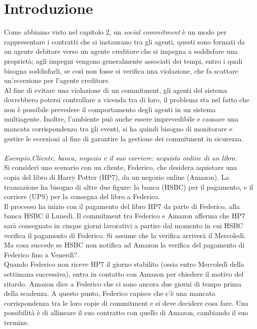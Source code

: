 \documentclass[a4paper,12pt]{report}
\begin{document}
\section{Introduzione}
Come abbiamo visto nel capitolo 2, un \textit{social commitment} è un modo per rappresentare i contratti che si instaurano tra gli agenti, questi sono formati da un agente debitore verso un agente creditore che si impegna a soddisfare una proprietà; agli impegni vengono generalmente associati dei tempi, entro i quali bisogna soddisfarli, se così non fosse si verifica una violazione, che fa scattare un'eccezione per l'agente creditore.\\
Al fine di evitare una violazione di un commitment, gli agenti del sistema dovrebbero potersi controllare a vicenda tra di loro, il problema sta nel fatto che non è possibile prevedere il comportamento degli agenti in un sistema multiagente. Inoltre, l'ambiente può anche essere imprevedibile e causare una mancata corrispondenza tra gli eventi, si ha quindi bisogno di monitorare e gestire le eccezioni al fine di garantire la gestione dei commitment in sicurezza.\\
\\\textit{Esempio.Cliente, banca, negozio e il suo corriere: acquisto online di un libro.}\\
Si consideri uno scenario \cite{rif5} con un cliente, Federico, che desidera aquistare una copia del libro di Harry Potter (HP7), da un negozio online (Amazon). La transazione ha bisogno di altre due figure: la banca (HSBC) per il pagamento, e il corriere (UPS) per la consegna del libro a Federico.\\
Il processo ha inizio con il pagamento del libro HP7 da parte di Federico, alla banca HSBC il Lunedì. Il commitment tra Federico e Amazon afferma che HP7 sarà consegnato in cinque giorni lavorativi a partire dal momento in cui HSBC verifica il pagamento di Federico. Si assume che la verifica arriverà il Mercoledì. Ma cosa succede se HSBC non notifica ad Amazon la verifica del pagamento di Federico fino a Venerdì?.
\\Quando Federico non riceve HP7 il giorno stabilito (ossia entro Mercoledì della settimana successiva), entra in contatto con Amazon per chiedere il motivo del ritardo. Amazon dice a Federico che ci sono ancora due giorni di tempo prima della scadenza. A questo punto, Federico capisce che c'è una mancata corrispondenza tra le loro copie di commitment e si deve decidere cosa fare. Una possibilità è di allineare il suo contratto con quello di Amazon, cambiando il suo termine.\\
\end{document}
